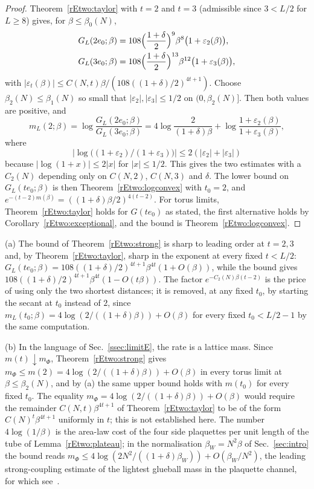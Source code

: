 \begin{proof}
Theorem~\ref{rEtwo:taylor} with $t=2$ and $t=3$ (admissible since $3<L/2$
for $L\ge8$) gives, for $\beta\le\beta_0(N)$,
\begin{align*}
G_L(2e_0;\beta)&=108\Bigl(\frac{1+\delta}2\Bigr)^{9}\beta^8\bigl(1+
\varepsilon_2(\beta)\bigr),\\
G_L(3e_0;\beta)&=108\Bigl(\frac{1+\delta}2\Bigr)^{13}\beta^{12}\bigl(1+
\varepsilon_3(\beta)\bigr),
\end{align*}
with $|\varepsilon_t(\beta)|\le C(N,t)\beta/(108((1+\delta)/2)^{4t+1})$.
Choose $\beta_2(N)\le\beta_1(N)$ so small that $|\varepsilon_2|,
|\varepsilon_3|\le1/2$ on $(0,\beta_2(N)]$. Then both values are positive,
and
\[
m_L(2;\beta)=\log\frac{G_L(2e_0;\beta)}{G_L(3e_0;\beta)}=4\log\frac2{(1+
\delta)\beta}+\log\frac{1+\varepsilon_2(\beta)}{1+\varepsilon_3(\beta)},
\]
where
\[
\bigl|\log\bigl((1+\varepsilon_2)/(1+\varepsilon_3)\bigr)\bigr|
\le2(|\varepsilon_2|+|\varepsilon_3|)
\]
because $|\log(1+x)|\le2|x|$ for $|x|\le1/2$. This gives
the two estimates with a $C_2(N)$ depending only on $C(N,2)$, $C(N,3)$ and
$\delta$. The lower bound on $G_L(te_0;\beta)$ is then
Theorem~\ref{rEtwo:logconvex} with $t_0=2$, and $e^{-(t-2)m(\beta)}=
((1+\delta)\beta/2)^{4(t-2)}$. For torus limits, Theorem~\ref{rEtwo:taylor}
holds for $G(te_0)$ as stated, the first alternative holds by
Corollary~\ref{rEtwo:exceptional}, and the bound is
Theorem~\ref{rEtwo:logconvex}.
\end{proof}

\begin{remark}\label{rEtwo:strongremark}
(a) The bound of Theorem~\ref{rEtwo:strong} is sharp to leading order at
$t=2,3$ and, by Theorem~\ref{rEtwo:taylor}, sharp in the exponent at every
fixed $t<L/2$: $G_L(te_0;\beta)=108((1+\delta)/2)^{4t+1}\beta^{4t}(1+O(
\beta))$, while the bound gives $108((1+\delta)/2)^{4t+1}\beta^{4t}(1-O(
t\beta))$. The factor $e^{-C_2(N)\beta(t-2)}$ is the price of using only
the two shortest distances; it is removed, at any fixed $t_0$, by starting
the secant at $t_0$ instead of $2$, since $m_L(t_0;\beta)=4\log(2/((1+
\delta)\beta))+O(\beta)$ for every fixed $t_0<L/2-1$ by the same
computation.

(b) In the language of Sec.~\ref{ssec:limitE}, the rate is a lattice mass.
Since $m(t)\downarrow m_\Phi$, Theorem~\ref{rEtwo:strong} gives $m_\Phi\le
m(2)=4\log(2/((1+\delta)\beta))+O(\beta)$ in every torus limit at $\beta
\le\beta_2(N)$, and by (a) the same upper bound holds with $m(t_0)$ for
every fixed $t_0$. The equality $m_\Phi=4\log(2/((1+\delta)\beta))+O(\beta)$
would require the remainder $C(N,t)\beta^{4t+1}$ of
Theorem~\ref{rEtwo:taylor} to be of the form $C(N)^t\beta^{4t+1}$ uniformly
in $t$; this is not established here. The number $4\log(1/\beta)$ is the
area-law cost of the four side plaquettes per unit length of the tube of
Lemma~\ref{rEtwo:plateau}; in the normalisation $\beta_W=N^2\beta$ of
Sec.~\ref{sec:intro} the bound reads $m_\Phi\le4\log(2N^2/((1+\delta)
\beta_W))+O(\beta_W/N^2)$, the leading strong-coupling estimate of the
lightest glueball mass in the plaquette channel, for which see~\cite{MM94}.
\end{remark}

